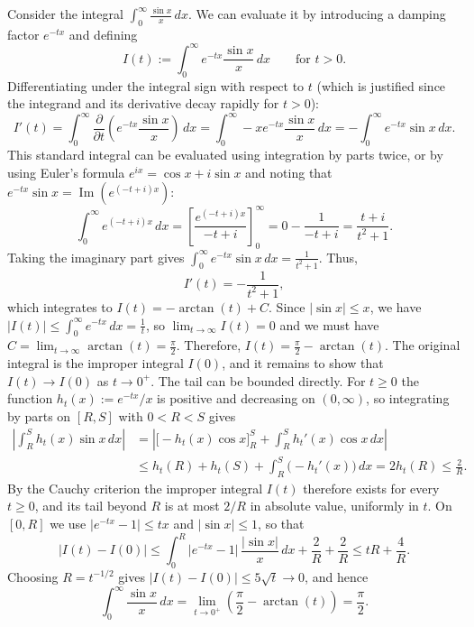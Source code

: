 \begin{example}
\label{ex:feynman_dirichlet_integral}
Consider the integral $\int_0^\infty \frac{\sin x}{x} \,dx$. We can evaluate it by introducing a damping factor $e^{-tx}$ and defining
\[I(t) := \int_0^\infty e^{-tx} \frac{\sin x}{x} \,dx \qquad \text{for } t > 0.\]
Differentiating under the integral sign with respect to $t$ (which is justified since the integrand and its derivative decay rapidly for $t>0$):
\[I'(t) = \int_0^\infty \frac{\partial}{\partial t} \left( e^{-tx} \frac{\sin x}{x} \right) \,dx = \int_0^\infty -x e^{-tx} \frac{\sin x}{x} \,dx = -\int_0^\infty e^{-tx} \sin x \,dx.\]
This standard integral can be evaluated using integration by parts twice, or by using Euler's formula $e^{ix} = \cos x + i\sin x$ and noting that $e^{-tx}\sin x = \operatorname{Im}(e^{(-t+i)x})$:
\[\int_0^\infty e^{(-t+i)x} \,dx = \left[ \frac{e^{(-t+i)x}}{-t+i} \right]_0^\infty = 0 - \frac{1}{-t+i} = \frac{t+i}{t^2+1}.\]
Taking the imaginary part gives $\int_0^\infty e^{-tx} \sin x \,dx = \frac{1}{t^2+1}$. Thus,
\[I'(t) = -\frac{1}{t^2+1},\]
which integrates to $I(t) = -\arctan(t) + C$.
Since $\lvert\sin x\rvert \le x$, we have $\lvert I(t)\rvert \le \int_0^\infty e^{-tx}\,dx = \frac1t$,
so $\lim_{t \to \infty} I(t) = 0$ and we must have $C = \lim_{t \to \infty} \arctan(t) = \frac{\pi}{2}$.
Therefore, $I(t) = \frac{\pi}{2} - \arctan(t)$.
The original integral is the improper integral $I(0)$, and it remains to show that
$I(t) \to I(0)$ as $t \to 0^+$. The tail can be bounded directly. For $t \ge 0$ the function
$h_t(x) := e^{-tx}/x$ is positive and decreasing on $(0,\infty)$, so integrating by parts on
$[R,S]$ with $0 < R < S$ gives
\[
\begin{aligned}
\left\lvert\int_R^S h_t(x)\sin x\,dx\right\rvert
&= \left\lvert\Big[-h_t(x)\cos x\Big]_R^S + \int_R^S h_t'(x)\cos x\,dx\right\rvert \\
&\le h_t(R) + h_t(S) + \int_R^S \big(-h_t'(x)\big)\,dx = 2h_t(R) \le \frac{2}{R}.
\end{aligned}
\]
By the Cauchy criterion the improper integral $I(t)$ therefore exists for every $t \ge 0$, and
its tail beyond $R$ is at most $2/R$ in absolute value, uniformly in $t$. On $[0,R]$ we use
$\lvert e^{-tx}-1\rvert \le tx$ and $\lvert\sin x\rvert \le 1$, so that
\[
\lvert I(t) - I(0)\rvert
\le \int_0^R \lvert e^{-tx}-1\rvert\,\frac{\lvert\sin x\rvert}{x}\,dx + \frac{2}{R} + \frac{2}{R}
\le tR + \frac{4}{R}.
\]
Choosing $R = t^{-1/2}$ gives $\lvert I(t)-I(0)\rvert \le 5\sqrt t \to 0$, and hence
\[\int_0^\infty \frac{\sin x}{x} \,dx = \lim_{t \to 0^+} \left( \frac{\pi}{2} - \arctan(t) \right) = \frac{\pi}{2}.\]
\end{example}

